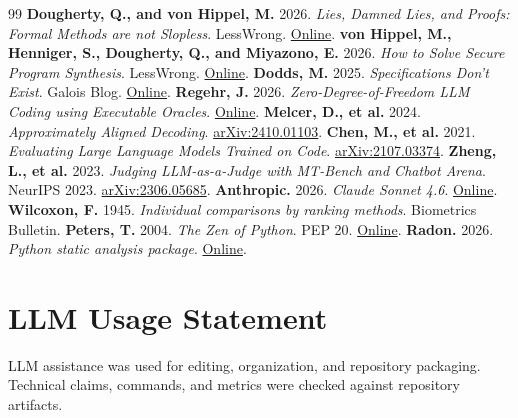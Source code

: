 \documentclass[11pt]{article}
\begin{document}
\begin{thebibliography}{99}
     \textbf{Dougherty, Q., and von Hippel, M.} 2026. \textit{Lies, Damned Lies, and Proofs: Formal Methods are not Slopless}. LessWrong. \href{https://www.lesswrong.com/posts/rhAPh3YzhPoBNpgHg/lies-damned-lies-and-proofs-formal-methods-are-not-slopless}{Online}.
     \textbf{von Hippel, M., Henniger, S., Dougherty, Q., and Miyazono, E.} 2026. \textit{How to Solve Secure Program Synthesis}. LessWrong. \href{https://www.lesswrong.com/posts/8wtrLoDPyCfMLuHkt/how-to-solve-secure-program-synthesis}{Online}.
     \textbf{Dodds, M.} 2025. \textit{Specifications Don't Exist}. Galois Blog. \href{https://www.galois.com/articles/specifications-dont-exist}{Online}.
     \textbf{Regehr, J.} 2026. \textit{Zero-Degree-of-Freedom LLM Coding using Executable Oracles}. \href{https://john.regehr.org/writing/zero_dof_programming.html}{Online}.
     \textbf{Melcer, D., et al.} 2024. \textit{Approximately Aligned Decoding}. \href{https://arxiv.org/abs/2410.01103}{arXiv:2410.01103}.
     \textbf{Chen, M., et al.} 2021. \textit{Evaluating Large Language Models Trained on Code}. \href{https://arxiv.org/abs/2107.03374}{arXiv:2107.03374}.
     \textbf{Zheng, L., et al.} 2023. \textit{Judging LLM-as-a-Judge with MT-Bench and Chatbot Arena}. NeurIPS 2023. \href{https://arxiv.org/abs/2306.05685}{arXiv:2306.05685}.
     \textbf{Anthropic.} 2026. \textit{Claude Sonnet 4.6}. \href{https://www.anthropic.com/claude/sonnet}{Online}.
     \textbf{Wilcoxon, F.} 1945. \textit{Individual comparisons by ranking methods}. Biometrics Bulletin.
     \textbf{Peters, T.} 2004. \textit{The Zen of Python}. PEP 20. \href{https://peps.python.org/pep-0020/}{Online}.
     \textbf{Radon.} 2026. \textit{Python static analysis package}. \href{https://radon.readthedocs.io/}{Online}.
\end{thebibliography}

\section*{LLM Usage Statement}

LLM assistance was used for editing, organization, and
repository packaging. Technical claims, commands, and metrics were checked
against repository artifacts.
\end{document}

